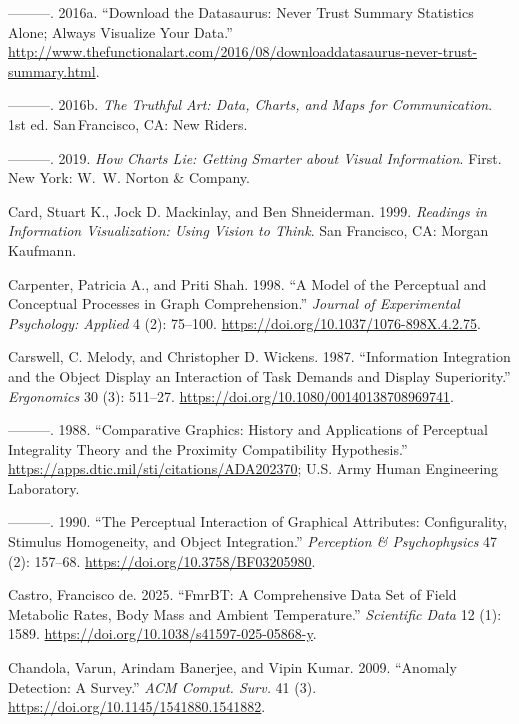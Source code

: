 \documentclass[
  letterpaper,
  DIV=11,
  numbers=noendperiod]{scrreprt}
\newlength{\cslhangindent}
\newenvironment{CSLReferences}[2] %
 {\begin{list}{}{%
  \setlength{\itemindent}{0pt}
  \setlength{\leftmargin}{0pt}
  \setlength{\parsep}{0pt}
  \ifodd #1
   \setlength{\leftmargin}{\cslhangindent}
   \setlength{\itemindent}{-1\cslhangindent}
  \fi
  \setlength{\itemsep}{#2\baselineskip}}}
 {\end{list}}
\begin{document}
\begin{CSLReferences}{1}{0}
---------. 2016a. {``Download the Datasaurus: Never Trust Summary
Statistics Alone; Always Visualize Your Data.''}
\url{http://www.thefunctionalart.com/2016/08/downloaddatasaurus-never-trust-summary.html}.

---------. 2016b. \emph{The Truthful Art: Data, Charts, and Maps for
Communication}. 1st ed. San\,Francisco, CA: New Riders.

---------. 2019. \emph{How Charts Lie: Getting Smarter about Visual
Information}. First. New York: W.~W. Norton \& Company.

Card, Stuart K., Jock D. Mackinlay, and Ben Shneiderman. 1999.
\emph{Readings in Information Visualization: Using Vision to Think}. San
Francisco, CA: Morgan Kaufmann.

Carpenter, Patricia A., and Priti Shah. 1998. {``A Model of the
Perceptual and Conceptual Processes in Graph Comprehension.''}
\emph{Journal of Experimental Psychology: Applied} 4 (2): 75--100.
\url{https://doi.org/10.1037/1076-898X.4.2.75}.

Carswell, C. Melody, and Christopher D. Wickens. 1987. {``Information
Integration and the Object Display an Interaction of Task Demands and
Display Superiority.''} \emph{Ergonomics} 30 (3): 511--27.
\url{https://doi.org/10.1080/00140138708969741}.

---------. 1988. {``Comparative Graphics: History and Applications of
Perceptual Integrality Theory and the Proximity Compatibility
Hypothesis.''} \url{https://apps.dtic.mil/sti/citations/ADA202370}; U.S.
Army Human Engineering Laboratory.

---------. 1990. {``The Perceptual Interaction of Graphical Attributes:
Configurality, Stimulus Homogeneity, and Object Integration.''}
\emph{Perception \& Psychophysics} 47 (2): 157--68.
\url{https://doi.org/10.3758/BF03205980}.

Castro, Francisco de. 2025. {``FmrBT: A Comprehensive Data Set of Field
Metabolic Rates, Body Mass and Ambient Temperature.''} \emph{Scientific
Data} 12 (1): 1589. \url{https://doi.org/10.1038/s41597-025-05868-y}.

Chandola, Varun, Arindam Banerjee, and Vipin Kumar. 2009. {``Anomaly
Detection: A Survey.''} \emph{ACM Comput. Surv.} 41 (3).
\url{https://doi.org/10.1145/1541880.1541882}.


\end{CSLReferences}
\end{document}
